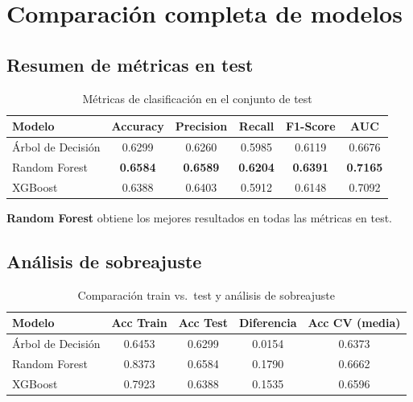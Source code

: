 \documentclass[12pt,a4paper]{article}
\begin{document}
\newpage
\section{Comparación completa de modelos}

\subsection{Resumen de métricas en test}

\begin{table}[H]
\centering
\caption{Métricas de clasificación en el conjunto de test}
\begin{tabular}{lccccc}
\toprule
\textbf{Modelo} & \textbf{Accuracy} & \textbf{Precision} & \textbf{Recall} & \textbf{F1-Score} & \textbf{AUC} \\
\midrule
Árbol de Decisión & 0.6299 & 0.6260 & 0.5985 & 0.6119 & 0.6676 \\
Random Forest & \textbf{0.6584} & \textbf{0.6589} & \textbf{0.6204} & \textbf{0.6391} & \textbf{0.7165} \\
XGBoost & 0.6388 & 0.6403 & 0.5912 & 0.6148 & 0.7092 \\
\bottomrule
\end{tabular}
\end{table}

\textbf{Random Forest} obtiene los mejores resultados en todas las métricas en test.

\subsection{Análisis de sobreajuste}

\begin{table}[H]
\centering
\caption{Comparación train vs.\ test y análisis de sobreajuste}
\begin{tabular}{lcccc}
\toprule
\textbf{Modelo} & \textbf{Acc Train} & \textbf{Acc Test} & \textbf{Diferencia} & \textbf{Acc CV (media)} \\
\midrule
Árbol de Decisión & 0.6453 & 0.6299 & 0.0154 & 0.6373 \\
Random Forest & 0.8373 & 0.6584 & 0.1790 & 0.6662 \\
XGBoost & 0.7923 & 0.6388 & 0.1535 & 0.6596 \\
\bottomrule
\end{tabular}
\end{table}
\end{document}
